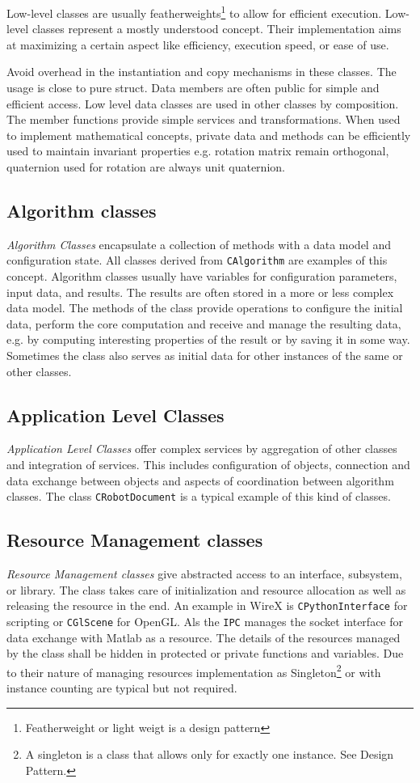 \documentclass[11pt,a4paper,onepage,openany]{book}
\begin{document}
Low-level classes are usually featherweights\footnote{Featherweight or light
weigt is a design pattern} to allow for efficient execution. Low-level classes
represent a mostly understood concept. Their implementation aims at maximizing
a certain aspect like efficiency, execution speed, or ease of use.

Avoid overhead in the instantiation and copy mechanisms in these classes. The
usage is close to pure struct. Data members are often public for simple and
efficient access. Low level data classes are used in other classes by
composition. The member functions provide simple services and transformations.
When used to implement mathematical concepts, private data and methods can be
efficiently used to maintain invariant properties e.g. rotation matrix remain
orthogonal, quaternion used for rotation are always unit quaternion.

\subsection{Algorithm classes}
\emph{Algorithm Classes} encapsulate a collection of methods with a data model
and configuration state. All classes derived from \texttt{CAlgorithm} are
examples of this concept. Algorithm classes usually have variables for
configuration parameters, input data, and results. The results are often stored
in a more or less complex data model. The methods of the class provide
operations to configure the initial data, perform the core computation and
receive and manage the resulting data, e.g. by computing interesting properties
of the result or by saving it in some way. Sometimes the class also serves as
initial data for other instances of the same or other classes.

\subsection{Application Level Classes}
\emph{Application Level Classes} offer complex services by aggregation of
other
classes and integration of services. This includes configuration of objects,
connection and data exchange between objects and aspects of coordination
between algorithm classes. The class \texttt{CRobotDocument} is a typical
example of this kind of classes.

\subsection{Resource Management classes}
\emph{Resource Management classes} give abstracted access to an interface,
subsystem, or library. The class takes care of initialization and resource
allocation as well as releasing the resource in the end. An example in WireX is
\texttt{CPythonInterface} for scripting or \texttt{CGlScene} for OpenGL. Als
the \texttt{IPC} manages the socket interface for data exchange with Matlab as
a resource. The details of the resources managed by the class shall be hidden
in protected or private functions and variables. Due to their nature of
managing resources implementation as Singleton\footnote{A singleton is a class
that allows only for exactly one instance. See Design Pattern.} or with
instance counting are typical but not required.
\end{document}
